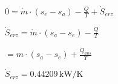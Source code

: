 \( 0 = \dot{m} \cdot (s_e - s_a) - \frac{\dot{Q}}{T} + \dot{S}_{erz} \)  

\( \dot{S}_{erz} = \dot{m} \cdot (s_a - s_e) - \frac{\dot{Q}}{T} \)  

\( = m \cdot (s_a - s_e) + \frac{\dot{Q}_{aus}}{T} \)  

\( \dot{S}_{erz} = 0.44209 \, \text{kW/K} \)